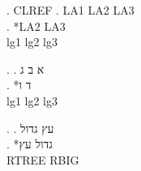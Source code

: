 
\ex. CLREF
\ag. LA1 LA2 LA3 \\
\bg. *LA2 {} LA3\\
\CommonGloss lg1 lg2 lg3\\

\begin{hebrew}
\ex.
\ag. א ב ג \\
\bg. *ד {} ו\\
\CommonGloss lg1 lg2 lg3\\
\end{hebrew}

\begingroup
\GlossRTL
\ex.
\ag. \texthebrew{עץ} \texthebrew{גדול}\\
\bg. *\texthebrew{גדול} \texthebrew{עץ}\\
\CommonGloss RTREE RBIG\\
\endgroup

